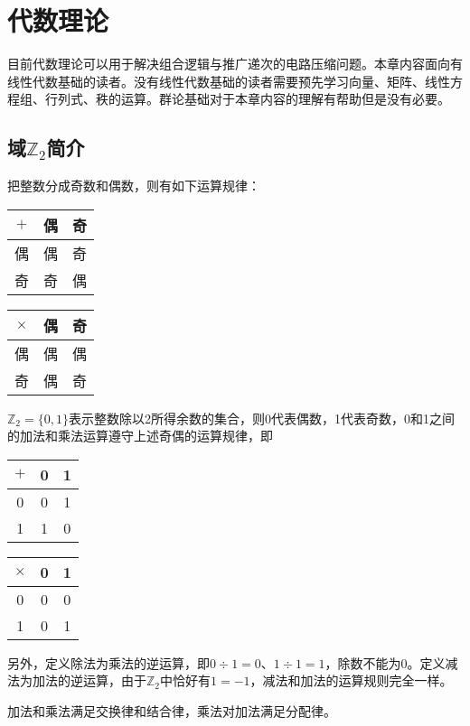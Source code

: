 \chapter{代数理论}

目前代数理论可以用于解决组合逻辑与推广递次的电路压缩问题。本章内容面向有线性代数基础的读者。没有线性代数基础的读者需要预先学习向量、矩阵、线性方程组、行列式、秩的运算。群论基础对于本章内容的理解有帮助但是没有必要。

\section{域$\mathbb{Z}_2$简介}
把整数分成奇数和偶数，则有如下运算规律：
\begin{center}
\begin{tabular}{|c|cc|}
	\hline
	$+$&偶&奇\\\hline
	偶&偶&奇\\
	奇&奇&偶\\\hline
\end{tabular}
\begin{tabular}{|c|cc|}
	\hline
	$\times$&偶&奇\\\hline
	偶&偶&偶\\
	奇&偶&奇\\\hline
\end{tabular}
\end{center}

$\mathbb{Z}_2=\{0,1\}$表示整数除以2所得余数的集合，则0代表偶数，1代表奇数，0和1之间的加法和乘法运算遵守上述奇偶的运算规律，即
\begin{center}
\begin{tabular}{|c|cc|}
	\hline
	$+$&0&1\\\hline
	0&0&1\\
	1&1&0\\\hline
\end{tabular}
\begin{tabular}{|c|cc|}
	\hline
	$\times$&0&1\\\hline
	0&0&0\\
	1&0&1\\\hline
\end{tabular}
\end{center}

另外，定义除法为乘法的逆运算，即$0\div 1=0$、$1\div 1=1$，除数不能为0。定义减法为加法的逆运算，由于$\mathbb{Z}_2$中恰好有$1=-1$，减法和加法的运算规则完全一样。

加法和乘法满足交换律和结合律，乘法对加法满足分配律。

